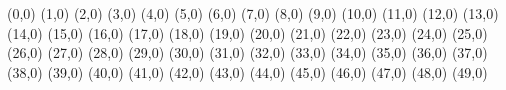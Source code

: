 (0,0)
(1,0)
(2,0)
(3,0)
(4,0)
(5,0)
(6,0)
(7,0)
(8,0)
(9,0)
(10,0)
(11,0)
(12,0)
(13,0)
(14,0)
(15,0)
(16,0)
(17,0)
(18,0)
(19,0)
(20,0)
(21,0)
(22,0)
(23,0)
(24,0)
(25,0)
(26,0)
(27,0)
(28,0)
(29,0)
(30,0)
(31,0)
(32,0)
(33,0)
(34,0)
(35,0)
(36,0)
(37,0)
(38,0)
(39,0)
(40,0)
(41,0)
(42,0)
(43,0)
(44,0)
(45,0)
(46,0)
(47,0)
(48,0)
(49,0)
